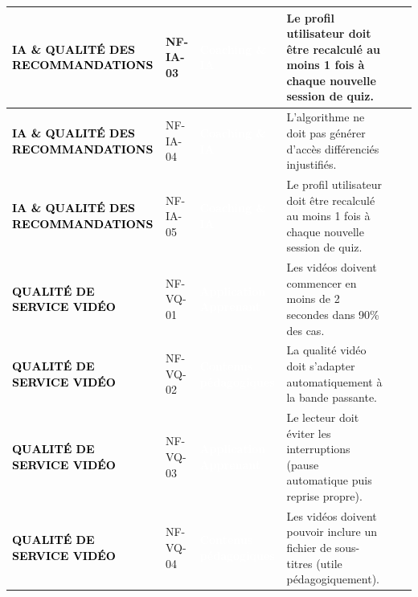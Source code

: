 \begin{longtable}{|P{2.15cm}|P{1.55cm}|P{2.35cm}|P{5.60cm}|P{1.65cm}|P{1.45cm}|}
\textcolor{black}{\textbf{IA \& QUALITÉ DES RECOMMANDATIONS}} & NF-IA-03 & \textcolor{white}{\textbf{Coaching \& IA}} & Le profil utilisateur doit être recalculé au moins 1 fois à chaque nouvelle session de quiz. &  &  \\ \hline
{}
\textcolor{black}{\textbf{IA \& QUALITÉ DES RECOMMANDATIONS}} & NF-IA-04 & \textcolor{white}{\textbf{Coaching \& IA}} & L’algorithme ne doit pas générer d’accès différenciés injustifiés. &  &  \\ \hline
{}
\textcolor{black}{\textbf{IA \& QUALITÉ DES RECOMMANDATIONS}} & NF-IA-05 & \textcolor{white}{\textbf{Coaching \& IA}} & Le profil utilisateur doit être recalculé au moins 1 fois à chaque nouvelle session de quiz. &  &  \\ \hline
{}
\textcolor{black}{\textbf{QUALITÉ DE SERVICE VIDÉO}} & NF-VQ-01 & \textcolor{white}{\textbf{Application Apprenant}} & Les vidéos doivent commencer en moins de 2 secondes dans 90\% des cas. &  &  \\ \hline
{}
\textcolor{black}{\textbf{QUALITÉ DE SERVICE VIDÉO}} & NF-VQ-02 & \textcolor{white}{\textbf{Contenus pédagogiques}} & La qualité vidéo doit s’adapter automatiquement à la bande passante. &  &  \\ \hline
{}
\textcolor{black}{\textbf{QUALITÉ DE SERVICE VIDÉO}} & NF-VQ-03 & \textcolor{white}{\textbf{Application Apprenant}} & Le lecteur doit éviter les interruptions (pause automatique puis reprise propre). &  &  \\ \hline
{}
\textcolor{black}{\textbf{QUALITÉ DE SERVICE VIDÉO}} & NF-VQ-04 & \textcolor{white}{\textbf{Contenus pédagogiques}} & Les vidéos doivent pouvoir inclure un fichier de sous-titres (utile pédagogiquement). &  &  \\ \hline

\end{longtable}
